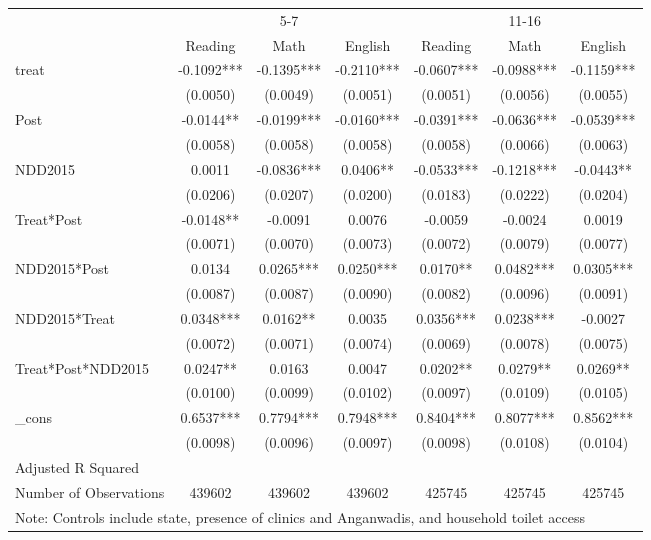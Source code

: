 {
\def\sym#1{\ifmmode^{#1}\else\(^{#1}\)\fi}
\begin{tabular}{l*{6}{c}}
\hline\hline
            &\multicolumn{3}{c}{5-7}&\multicolumn{3}{c}{11-16}\\\cmidrule(lr){2-4}\cmidrule(lr){5-7}
            &\multicolumn{1}{c}{Reading}&\multicolumn{1}{c}{Math}&\multicolumn{1}{c}{English}&\multicolumn{1}{c}{Reading}&\multicolumn{1}{c}{Math}&\multicolumn{1}{c}{English}\\
\hline
treat       &-0.1092***&-0.1395***&-0.2110***&-0.0607***&-0.0988***&-0.1159***\\
            &(0.0050)   &(0.0049)   &(0.0051)   &(0.0051)   &(0.0056)   &(0.0055)   \\
[1em]
Post        &-0.0144** &-0.0199***&-0.0160***&-0.0391***&-0.0636***&-0.0539***\\
            &(0.0058)   &(0.0058)   &(0.0058)   &(0.0058)   &(0.0066)   &(0.0063)   \\
[1em]
NDD2015     &0.0011   &-0.0836***&0.0406** &-0.0533***&-0.1218***&-0.0443** \\
            &(0.0206)   &(0.0207)   &(0.0200)   &(0.0183)   &(0.0222)   &(0.0204)   \\
[1em]
Treat*Post  &-0.0148** &-0.0091   &0.0076   &-0.0059   &-0.0024   &0.0019   \\
            &(0.0071)   &(0.0070)   &(0.0073)   &(0.0072)   &(0.0079)   &(0.0077)   \\
[1em]
NDD2015*Post&0.0134   &0.0265***&0.0250***&0.0170** &0.0482***&0.0305***\\
            &(0.0087)   &(0.0087)   &(0.0090)   &(0.0082)   &(0.0096)   &(0.0091)   \\
[1em]
NDD2015*Treat&0.0348***&0.0162** &0.0035   &0.0356***&0.0238***&-0.0027   \\
            &(0.0072)   &(0.0071)   &(0.0074)   &(0.0069)   &(0.0078)   &(0.0075)   \\
[1em]
Treat*Post*NDD2015&0.0247** &0.0163   &0.0047   &0.0202** &0.0279** &0.0269** \\
            &(0.0100)   &(0.0099)   &(0.0102)   &(0.0097)   &(0.0109)   &(0.0105)   \\
[1em]
\_cons      &0.6537***&0.7794***&0.7948***&0.8404***&0.8077***&0.8562***\\
            &(0.0098)   &(0.0096)   &(0.0097)   &(0.0098)   &(0.0108)   &(0.0104)   \\
\hline
Adjusted R Squared&    &    &    &    &    &    \\
Number of Observations&439602   &439602   &439602   &425745   &425745   &425745   \\
\hline\hline
\multicolumn{7}{l}{\footnotesize Note: Controls include state, presence of clinics and Anganwadis, and household toilet access}\\
\end{tabular}
}
